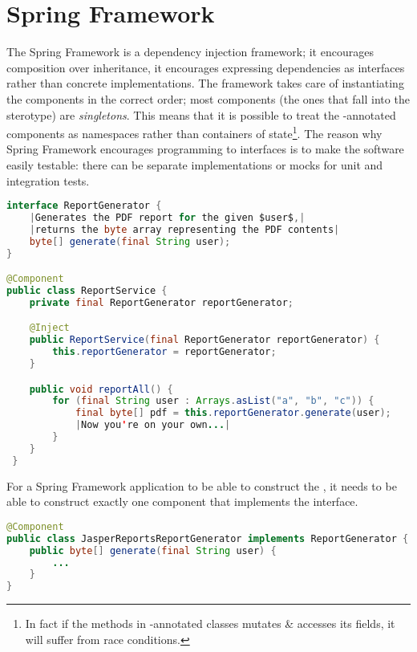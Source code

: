 \documentclass[10 pt]{article}
\begin{document}
\section{Spring Framework}
The Spring Framework is a dependency injection framework; it encourages composition over inheritance, it encourages expressing dependencies as interfaces rather than concrete implementations. The framework takes care of instantiating the components in the correct order; most components (the ones that fall into the  sterotype) are \emph{singletons}. This means that it is possible to treat the -annotated components as namespaces rather than containers of state\footnote{In fact if the methods in -annotated classes mutates \& accesses its fields, it will suffer from race conditions.}. The reason why Spring Framework encourages programming to interfaces is to make the software easily testable: there can be separate implementations or mocks for unit and integration tests.

\begin{lstlisting}[caption={Components}, label={code:sf1-java}, language=Java, escapechar=|]
interface ReportGenerator {
    |Generates the PDF report for the given $user$,|
    |returns the byte array representing the PDF contents|
    byte[] generate(final String user);
}

@Component
public class ReportService {
    private final ReportGenerator reportGenerator;

    @Inject
    public ReportService(final ReportGenerator reportGenerator) {
        this.reportGenerator = reportGenerator;
    }

    public void reportAll() {
        for (final String user : Arrays.asList("a", "b", "c")) {
            final byte[] pdf = this.reportGenerator.generate(user);
            |Now you're on your own...|
        }
    }
 }
\end{lstlisting}

For a Spring Framework application to be able to construct the , it needs to be able to construct exactly one component that implements the  interface.

\begin{lstlisting}[caption={Components}, label={code:sf2-java}, language=Java, escapechar=|]
@Component
public class JasperReportsReportGenerator implements ReportGenerator {
    public byte[] generate(final String user) {
        ...
    }
}
\end{lstlisting}
\end{document}
